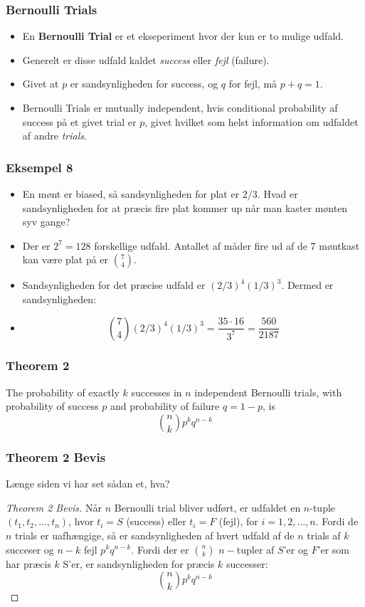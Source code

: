 \documentclass{beamer}
\begin{document}
\begin{frame}
  \frametitle{Bernoulli Trials}
  \begin{itemize}
  \item En \textbf{Bernoulli Trial} er et ekseperiment hvor der kun er to mulige udfald. 
  \item Generelt er disse udfald kaldet \textit{success} eller \textit{fejl} (failure). 
  \item Givet at $p$ er sandsynligheden for success, og $q$ for fejl, må $p + q = 1$.
  \item Bernoulli Trials er mutually independent, hvis conditional probability af success på et givet trial er $p$, givet hvilket som helst information om udfaldet af andre \textit{trials}.
  \end{itemize} 
\end{frame}

\begin{frame}
  \frametitle{Eksempel 8}
  \begin{itemize}
  \item<1-> En mønt er biased, så sandsynligheden for plat er $2/3$. Hvad er sandsynligheden for at præcis fire plat kommer up når man kaster mønten syv gange? 
  \item<2-> Der er $2^{7} = 128$  forskellige udfald. Antallet af måder fire ud af de 7 møntkast kan være plat på er $\binom{7}{4}$. 
  \item<2-> Sandsynligheden for det præcise udfald er $(2/3)^{4}(1/3)^{3}$. Dermed er sandsynligheden:
  \item<3-> \[ \binom{7}{4} (2/3)^{4} (1/3)^{3} = \frac{35 \cdot 16}{3^{7}} = \frac{560}{2187} \]
  \end{itemize}
\end{frame}

\begin{frame}
  \frametitle{Theorem 2}
  \begin{theorem}[Theorem 2]
    The probability of exactly $k$ successes in $n$ independent Bernoulli trials, with probability of success $p$ and probability of failure $q = 1 - p$, is
    \[\binom{n}{k} p^{k} q^{n-k} \]
  \end{theorem}
\end{frame}
\begin{frame}
  \frametitle{Theorem 2 Bevis}
  Længe siden vi har set sådan et, hva? 
  \begin{proof}[Theorem 2 Bevis]
    Når $n$ Bernoulli trial bliver udført, er udfaldet en $n$-tuple $(t_{1}, t_{2},\ldots, t_{n})$, hvor $t_{i} = S$ (success) eller $t_{i} = F$ (fejl), for $i = 1, 2, \ldots, n$. Fordi de $n$ trials er uafhængige, så er sandsynligheden af hvert udfald af de $n$ trials af $k$ succeser og $n-k$ fejl $p^{k}q^{n-k}$. Fordi der er $\binom{n}{k}$ $n-$tupler af $S$'er og $F$'er som har præcis $k$ S'er, er sandsynligheden for præcis $k$ successer:
    \[ \binom{n}{k}p^{k}q^{n-k} \]
  \end{proof} 
\end{frame}
\end{document}
